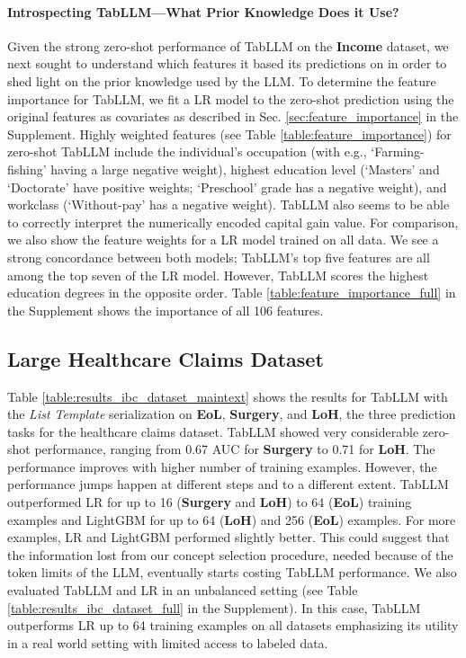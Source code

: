 \paragraph{Introspecting TabLLM---What Prior Knowledge Does it Use?} Given the strong zero-shot performance of TabLLM on the \textbf{Income} dataset, we next sought to understand which features it based its predictions on in order to shed light on the prior knowledge used by the LLM. To determine the feature importance for TabLLM, we fit a LR model to the zero-shot prediction using the original features as covariates as described in Sec. \ref{sec:feature_importance} in the Supplement. Highly weighted features (see Table \ref{table:feature_importance}) for zero-shot TabLLM include the individual's occupation  (with e.g., `Farming-fishing' having a large negative weight), highest education level (`Masters' and `Doctorate' have positive weights; `Preschool' grade has a negative weight), and workclass (`Without-pay' has a negative weight). TabLLM also seems to be able to correctly interpret the numerically encoded capital gain value. For comparison, we also show the feature weights for a LR model trained on all data. We see a strong concordance between both models; TabLLM's top five features are all among the top seven of the LR model. However, TabLLM scores the highest education degrees in the opposite order. Table \ref{table:feature_importance_full} in the Supplement shows the importance of all 106 features.

\subsection{Large Healthcare Claims Dataset} Table \ref{table:results_ibc_dataset_maintext} shows the results for TabLLM with the \textit{List Template} serialization on \textbf{EoL}, \textbf{Surgery}, and \textbf{LoH}, the three prediction tasks for the healthcare claims dataset. TabLLM showed very considerable zero-shot performance, ranging from 0.67 AUC for \textbf{Surgery} to 0.71 for \textbf{LoH}.
The performance improves with higher number of training examples. However, the performance jumps happen at different steps and to a different extent. TabLLM outperformed LR for up to 16 (\textbf{Surgery} and \textbf{LoH}) to 64 (\textbf{EoL}) training examples and LightGBM for up to 64 (\textbf{LoH}) and 256 (\textbf{EoL}) examples. For more examples, LR and LightGBM performed slightly better. This could suggest that the information lost from our concept selection procedure, needed because of the token limits of the LLM, eventually starts costing TabLLM performance. We also evaluated TabLLM and LR in an unbalanced setting (see Table \ref{table:results_ibc_dataset_full} in the Supplement). In this case, TabLLM outperforms LR up to 64 training examples on all datasets emphasizing its utility in a real world setting with limited access to labeled data.

